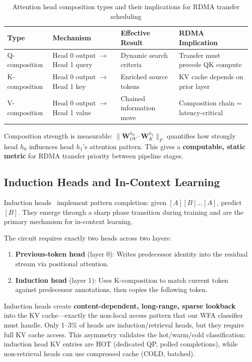 \documentclass[11pt,letterpaper]{article}
\begin{document}
\begin{table}[htbp]
\centering
\caption{Attention head composition types and their implications for RDMA transfer scheduling}
\label{tab:composition}
\begin{tabular}{@{}llll@{}}
\toprule
\textbf{Type} & \textbf{Mechanism} & \textbf{Effective Result} & \textbf{RDMA Implication} \\
\midrule
Q-composition & Head 0 output $\to$ Head 1 query & Dynamic search criteria & Transfer must precede QK compute \\
K-composition & Head 0 output $\to$ Head 1 key & Enriched source tokens & KV cache depends on prior layer \\
V-composition & Head 0 output $\to$ Head 1 value & Chained information move & Composition chain = latency-critical \\
\bottomrule
\end{tabular}
\end{table}

Composition strength is measurable: $\|\mathbf{W}_{OV}^{h_0} \cdot \mathbf{W}_K^{h_1}\|_F$ quantifies how strongly head $h_0$ influences head $h_1$'s attention pattern. This gives a \textbf{computable, static metric} for RDMA transfer priority between pipeline stages.

\subsection{Induction Heads and In-Context Learning}

Induction heads~\cite{olsson2022induction} implement pattern completion: given $[A][B]\ldots[A]$, predict $[B]$. They emerge through a sharp phase transition during training and are the primary mechanism for in-context learning.

The circuit requires exactly two heads across two layers:
\begin{enumerate}
    \item \textbf{Previous-token head} (layer 0): Writes predecessor identity into the residual stream via positional attention.
    \item \textbf{Induction head} (layer 1): Uses K-composition to match current token against predecessor annotations, then copies the following token.
\end{enumerate}

Induction heads create \textbf{content-dependent, long-range, sparse lookback} into the KV cache---exactly the non-local access pattern that our WFA classifier must handle. Only 1--3\% of heads are induction/retrieval heads, but they require full KV cache access. This asymmetry validates the hot/warm/cold classification: induction head KV entries are HOT (dedicated QP, polled completions), while non-retrieval heads can use compressed cache (COLD, batched).
\end{document}
